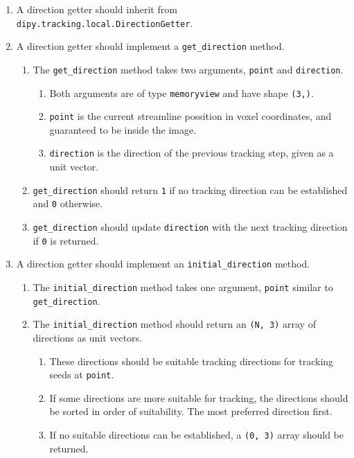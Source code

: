 \begin{enumerate}
\item A direction getter should inherit from \verb|dipy.tracking.local.DirectionGetter|.
\item A direction getter should implement a \verb|get_direction| method.
\begin{enumerate}
\item The \verb|get_direction| method takes two arguments, \verb|point| and \verb|direction|.
\begin{enumerate}
\item Both arguments are of type \verb|memoryview| and have shape \verb|(3,)|.
\item \verb|point| is the current streamline possition in voxel coordinates, and guaranteed to be inside the image.
\item \verb|direction| is the direction of the previous tracking step, given as a unit vector.
\end{enumerate}
\item \verb|get_direction| should return \verb|1| if no tracking direction can be established and \verb|0| otherwise.
\item \verb|get_direction| should update \verb|direction| with the next tracking direction if \verb|0| is returned.
\end{enumerate}
\item A direction getter should implement an \verb|initial_direction| method.
\begin{enumerate}
\item The \verb|initial_direction| method takes one argument, \verb|point| similar to \verb|get_direction|.
\item The \verb|initial_direction| method should return an \verb|(N, 3)| array of directions as unit vectors.
\begin{enumerate}
\item These directions should be suitable tracking directions for tracking seeds at \verb|point|.
\item If some directions are more suitable for tracking, the directions should be sorted in order of suitability. The most preferred direction first.  
\item If no suitable directions can be established, a \verb|(0, 3)| array should be returned.
\end{enumerate}
\end{enumerate}
\end{enumerate}